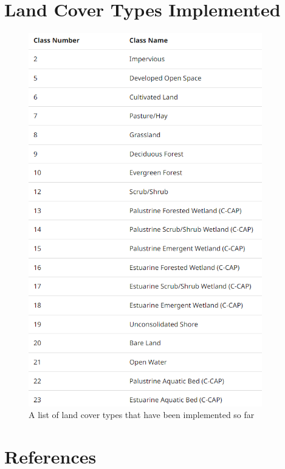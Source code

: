 \documentclass{amsart}
\begin{document}
\section{Land Cover Types Implemented}

\begin{figure}[H]
      \caption{A list of land cover types that have been implemented so far}
      \begin{center}
            \includegraphics[width=4in]{../figures/landcover.png}
      \end{center}
\end{figure}


\section{References}
\end{document}
